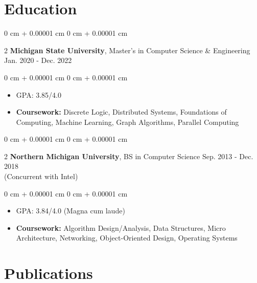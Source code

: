 \documentclass[10pt, letterpaper]{article}
\newenvironment{highlights}{ \begin{itemize}[ topsep=\subsectiongap, parsep=\subsectiongap, partopsep=0pt,
itemsep=0pt, leftmargin=0 cm + 10pt ] }{ \end{itemize} } %
\newenvironment{onecolentry}{ \begin{adjustwidth}{ 0 cm + 0.00001 cm }{ 0 cm + 0.00001 cm }
}{ \end{adjustwidth} } %
\newenvironment{twocolentry}[2][]{ \onecolentry \def\secondColumn{#2} \setcolumnwidth{\fill, 4.5 cm}
\begin{paracol}{2} }{ \switchcolumn \raggedleft \secondColumn  \end{paracol}
\endonecolentry } %
\newcommand{\sectionoffset}{-0.12 cm}
\newcommand{\ssubsectiongap}{ 0.0953}
\newcommand{\ssubsectiongapd}{\fpeval{2 * \ssubsectiongap}}
\newcommand{\subsectiongap}{\ssubsectiongap cm}
\newcommand{\subsectiongapd}{\ssubsectiongapd cm}
\begin{document}
	\section{Education}

	\begin{twocolentry}
		{ Jan. 2020 - Dec. 2022 } \textbf{Michigan State University}, Master's in Computer
		Science \& Engineering
	\end{twocolentry}

	\vspace{\subsectiongap}
	\begin{onecolentry}
		\begin{highlights}
			\item GPA: 3.85/4.0 \item {\small {\textbf{Coursework:} Discrete Logic, Distributed Systems, Foundations of Computing, Machine Learning, Graph Algorithms, Parallel Computing}}
		\end{highlights}
	\end{onecolentry}

	\vspace{\subsectiongapd}

	\begin{twocolentry}
		{ Sep. 2013 - Dec. 2018 \\ (Concurrent with Intel)\vspace{-0.35cm}} \textbf{Northern Michigan University}, BS in Computer
		Science
	\end{twocolentry}

	\vspace{\subsectiongap}
	\begin{onecolentry}
		\begin{highlights}
			\item GPA: 3.84/4.0 (Magna cum laude)
			\item {\small \textbf{Coursework:} {Algorithm Design/Analysis, Data Structures, Micro Architecture, Networking, Object-Oriented Design, Operating Systems}}
		\end{highlights}
	\end{onecolentry}

	\vspace{\sectionoffset}

	\section{Publications}
\end{document}
